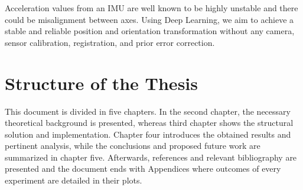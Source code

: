 Acceleration values from an IMU are well known to be highly unstable and there could be misalignment between axes. Using Deep Learning, we aim to achieve a stable and reliable position and orientation transformation without any camera, sensor calibration, registration, and prior error correction.


\section{Structure of the Thesis}

This document is divided in five chapters. In the second chapter, the necessary
theoretical background is presented, whereas third chapter shows the structural
solution and implementation. Chapter four introduces the obtained results and
pertinent analysis, while the conclusions and proposed future work are summarized
in chapter five. Afterwards, references and relevant bibliography are presented and
the document ends with Appendices where outcomes of every experiment are detailed
in their plots.
